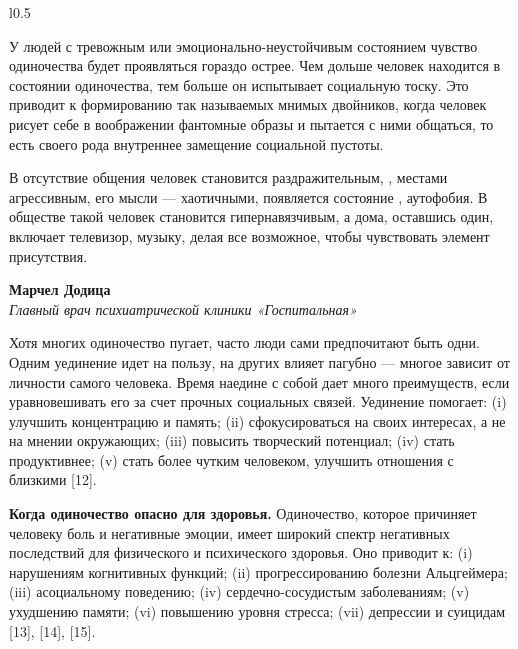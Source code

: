 \begin{wrapfigure}{l}{0.5\textwidth}
    \begin{fancyquotes}
        У людей с тревожным или эмоционально-неустойчивым состоянием чувство
        одиночества будет проявляться гораздо острее.
        Чем дольше человек находится в состоянии одиночества,
        тем больше он испытывает социальную тоску.
        Это приводит к формированию так называемых мнимых двойников,
        когда человек рисует себе в воображении фантомные образы и
        пытается с ними общаться, то есть своего рода внутреннее замещение
        социальной пустоты.

        В отсутствие общения человек становится раздражительным,
        ,
        местами агрессивным, его мысли --- хаотичными,
        появляется состояние ,
        аутофобия.
        В обществе такой человек становится гипернавязчивым,
        а дома, оставшись один, включает телевизор, музыку,
        делая все возможное, чтобы чувствовать элемент присутствия.

        \begin{flushright}
            \textbf{Марчел Додица}\\
            \textit{Главный врач психиатрической клиники «Госпитальная»}
        \end{flushright}
    \end{fancyquotes}
\end{wrapfigure}
Хотя многих одиночество пугает, часто люди сами предпочитают быть одни.
Одним уединение идет на пользу, на других влияет пагубно ---
многое зависит от личности самого человека.
Время наедине с собой дает много преимуществ,
если уравновешивать его за счет прочных социальных связей.
Уединение помогает:
(i) улучшить концентрацию и память;
(ii) сфокусироваться на своих интересах, а не на мнении окружающих;
(iii) повысить творческий потенциал;
(iv) стать продуктивнее;
(v) стать более чутким человеком, улучшить отношения с близкими [12].

\textbf{Когда одиночество опасно для здоровья.}
Одиночество, которое причиняет человеку боль и негативные эмоции,
имеет широкий спектр негативных последствий для физического и
психического здоровья. Оно приводит к:
(i) нарушениям когнитивных функций;
(ii) прогрессированию болезни Альцгеймера;
(iii) асоциальному поведению;
(iv) сердечно-сосудистым заболеваниям;
(v) ухудшению памяти;
(vi) повышению уровня стресса;
(vii) депрессии и суицидам [13], [14], [15].

